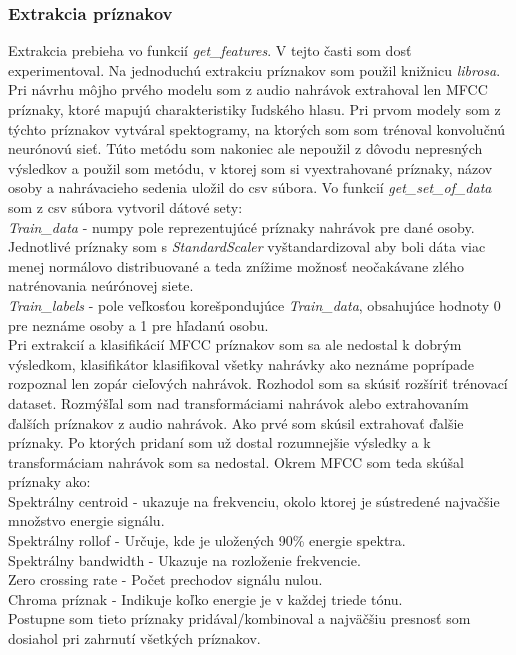 \documentclass{article}
\begin{document}
    \subsubsection{Extrakcia príznakov}
    \Large{Extrakcia prebieha vo funkcií \textit{get\_features}. V tejto časti som dosť experimentoval. Na jednoduchú extrakciu príznakov som použil knižnicu \textit{librosa}. Pri návrhu môjho prvého modelu som z audio nahrávok extrahoval len MFCC príznaky, ktoré mapujú charakteristiky ľudského hlasu. Pri prvom modely som z týchto príznakov vytváral spektogramy, na ktorých som som trénoval konvolučnú neurónovú sieť. Túto metódu som nakoniec ale nepoužil z dôvodu nepresných výsledkov a použil som metódu, v ktorej som si vyextrahované príznaky, názov osoby a nahrávacieho sedenia uložil do csv súbora. Vo funkcií \textit{get\_set\_of\_data} som z csv súbora vytvoril dátové sety: \\ \textit{Train\_data} - numpy pole reprezentujúcé príznaky nahrávok pre dané osoby. Jednotlivé príznaky som s \textit{StandardScaler} vyštandardizoval aby boli dáta viac menej normálovo distribuované a teda znížime možnosť neočakávane zlého natrénovania neúrónovej siete.\\ \textit{Train\_labels} - pole veľkosťou korešpondujúce \textit{Train\_data}, obsahujúce hodnoty 0 pre neznáme osoby a 1 pre hľadanú osobu.\\
    Pri extrakcií a klasifikácií MFCC príznakov som sa ale nedostal k dobrým výsledkom, klasifikátor klasifikoval všetky nahrávky ako neznáme poprípade rozpoznal len zopár cieľových nahrávok. Rozhodol som sa skúsiť rozšíriť trénovací dataset. Rozmýšľal som nad transformáciami nahrávok alebo extrahovaním ďalších príznakov z audio nahrávok. Ako prvé som skúsil extrahovať ďalšie príznaky. Po ktorých pridaní som už dostal rozumnejšie výsledky a k transformáciam nahrávok som sa nedostal. Okrem MFCC som teda skúšal príznaky ako: \\
    Spektrálny centroid - ukazuje na frekvenciu, okolo ktorej je sústredené najvačšie množstvo energie signálu.\\
    Spektrálny rollof - Určuje, kde je uložených 90\% energie spektra.\\
    Spektrálny bandwidth - Ukazuje na rozloženie frekvencie.\\
    Zero crossing rate - Počet prechodov signálu nulou.\\
    Chroma príznak - Indikuje koľko energie je v každej triede tónu.\\
    Postupne som tieto príznaky pridával/kombinoval a najväčšiu presnosť som dosiahol pri zahrnutí všetkých príznakov.
    }
\end{document}
